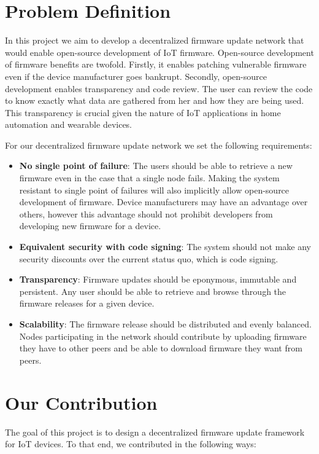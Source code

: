 {\section{Problem Definition} \label{sec:PD}{

In this project we aim to develop a decentralized firmware update network that would enable open-source development of IoT firmware. Open-source development of firmware benefits are twofold. Firstly, it enables patching vulnerable firmware even if the device manufacturer goes bankrupt. Secondly, open-source development enables transparency and code review. The user can review the code to know exactly what data are gathered from her and how they are being used. This transparency is crucial given the nature of IoT applications in home automation and wearable devices.

For our decentralized firmware update network we set the following requirements:
\begin{itemize}
    \item \textbf{No single point of failure}: The users should be able to retrieve a new firmware even in the case that a single node fails. Making the system resistant to single point of failures will also implicitly allow open-source development of firmware. Device manufacturers may have an advantage over others, however this advantage should not prohibit developers from developing new firmware for a device. 
    \item \textbf{Equivalent security with code signing}: The system should not make any security discounts over the current status quo, which is code signing.
    \item \textbf{Transparency}: Firmware updates should be eponymous, immutable and persistent. Any user should be able to retrieve and browse through the firmware releases for a given device.
    \item \textbf{Scalability}: The firmware release should be distributed and evenly balanced. Nodes participating in the network should contribute by uploading firmware they have to other peers and be able to download firmware they want from peers.
\end{itemize}

}

\section{Our Contribution}{

The goal of this project is to design a decentralized firmware update framework for IoT devices. To that end, we contributed in the following ways:

}}
